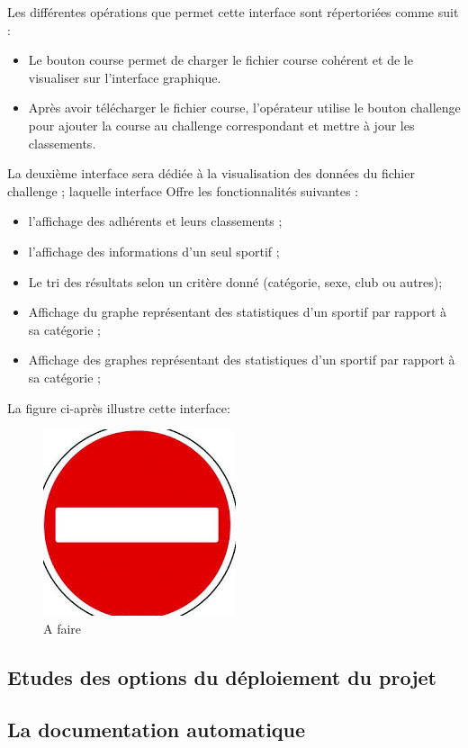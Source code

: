 \documentclass[12pt,a4paper]{report}
\begin{document}
Les différentes opérations que permet cette interface sont répertoriées comme suit : 
\begin{itemize} 
\item  Le bouton course permet de charger le fichier course cohérent et de le visualiser sur l’interface graphique.
\item Après avoir télécharger le fichier course, l’opérateur utilise le bouton challenge pour ajouter la course au challenge correspondant et mettre à jour les classements.
\end{itemize} 

La deuxième interface sera dédiée à la visualisation des données du fichier challenge ; laquelle interface 
Offre les fonctionnalités suivantes : 
\begin{itemize} 
\item l’affichage des adhérents et leurs classements ; 
 \item l’affichage des informations d’un seul sportif ;
 \item Le tri des résultats selon un critère donné (catégorie, sexe, club ou autres);
 \item Affichage du graphe représentant des statistiques d’un sportif par rapport à sa catégorie ;
 \item Affichage des graphes représentant des statistiques d’un sportif par rapport à sa catégorie ;
\end{itemize} 
La figure ci-après illustre cette interface:
\begin{figure}
	  \center
	  \includegraphics[scale=0.5]{img/A_faire.png}
	   \caption {A faire }
\end{figure}


\subsection {Etudes des options du déploiement du projet }

\subsection {La documentation automatique  }
\end{document}
